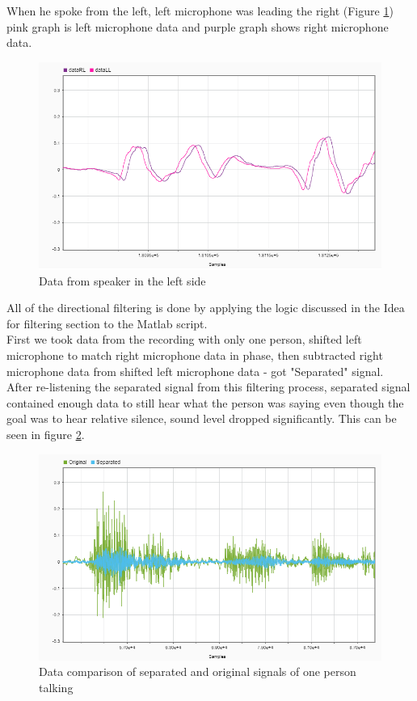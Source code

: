 When he spoke from the left, left microphone was leading the right (Figure \ref{fig:L}) pink graph is left microphone data and purple graph shows right microphone data.\\

 
\begin{figure}[htp]
  \centering
  \includegraphics[width=0.75\linewidth]{Illustrations/DataL.png}
  \caption{Data from speaker in the left side}
  \label{fig:L}
\end{figure}

 

All of the directional filtering is done by applying the logic discussed in the Idea for filtering section to 
the Matlab script.\\
First we took data from the recording with only one person, shifted left microphone to match right microphone 
data in phase, then subtracted right microphone data from shifted left microphone data - got "Separated" signal.\\
After re-listening the separated signal from this filtering process, separated signal contained enough data to 
still hear what the person was saying even though the goal was to hear relative silence, sound level dropped 
significantly. This can be seen in figure \ref{fig:oneSourceSepAndOG}.

\begin{figure}[htp]
  \centering
  \includegraphics[width=0.75\linewidth]{Illustrations/OnePersonOriginalAndSeparated.png}
  \caption{Data comparison of separated and original signals of one person talking}
  \label{fig:oneSourceSepAndOG}
\end{figure}

